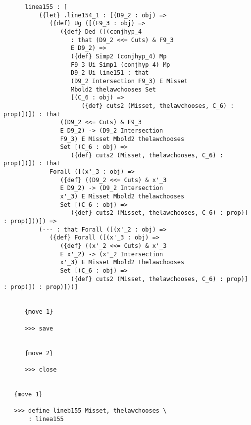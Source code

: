 \documentclass[12pt]{article}
\begin{document}
\begin{verbatim}
      linea155 : [
          ({let} .line154_1 : [(D9_2 : obj) => 
             ({def} Ug ([(F9_3 : obj) => 
                ({def} Ded ([(conjhyp_4 
                   : that (D9_2 <<= Cuts) & F9_3 
                   E D9_2) => 
                   ({def} Simp2 (conjhyp_4) Mp 
                   F9_3 Ui Simp1 (conjhyp_4) Mp 
                   D9_2 Ui line151 : that 
                   (D9_2 Intersection F9_3) E Misset 
                   Mbold2 thelawchooses Set 
                   [(C_6 : obj) => 
                      ({def} cuts2 (Misset, thelawchooses, C_6) : prop)])]) : that 
                ((D9_2 <<= Cuts) & F9_3 
                E D9_2) -> (D9_2 Intersection 
                F9_3) E Misset Mbold2 thelawchooses 
                Set [(C_6 : obj) => 
                   ({def} cuts2 (Misset, thelawchooses, C_6) : prop)])]) : that 
             Forall ([(x'_3 : obj) => 
                ({def} ((D9_2 <<= Cuts) & x'_3 
                E D9_2) -> (D9_2 Intersection 
                x'_3) E Misset Mbold2 thelawchooses 
                Set [(C_6 : obj) => 
                   ({def} cuts2 (Misset, thelawchooses, C_6) : prop)] : prop)]))]) => 
          (--- : that Forall ([(x'_2 : obj) => 
             ({def} Forall ([(x'_3 : obj) => 
                ({def} ((x'_2 <<= Cuts) & x'_3 
                E x'_2) -> (x'_2 Intersection 
                x'_3) E Misset Mbold2 thelawchooses 
                Set [(C_6 : obj) => 
                   ({def} cuts2 (Misset, thelawchooses, C_6) : prop)] : prop)]) : prop)]))]


      {move 1}

      >>> save


      {move 2}

      >>> close


   {move 1}

   >>> define lineb155 Misset, thelawchooses \
       : linea155



\end{verbatim}
\end{document}
